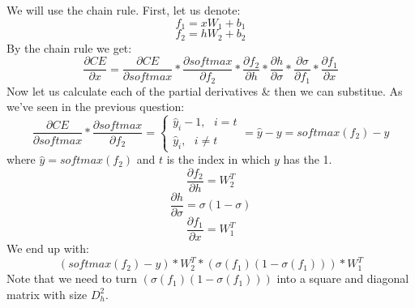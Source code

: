 We will use the chain rule. First, let us denote:
$$f_1 = xW_1 + b_1$$
$$f_2 = hW_2 + b_2$$
By the chain rule we get:
$$\frac{\partial CE}{\partial x} = \frac{\partial CE}{\partial softmax} * \frac{\partial softmax}{\partial f_2} * \frac{\partial f_2}{\partial h} * \frac{\partial h}{\partial \sigma} * \frac{\partial \sigma}{\partial f_1}* \frac{\partial f_1}{\partial x}$$
Now let us calculate each of the partial derivatives \& then we can substitue.
As we've seen in the previous question:
$$
\frac{\partial CE}{\partial softmax} * \frac{\partial softmax}{\partial f_2}=
\begin{cases}
\hat{y}_i - 1, \text{ } i=t  \\ 
\hat{y}_i, \text{     } i\neq t
\end{cases} = \hat{y}-y=softmax(f_2)-y
$$
where $\hat{y}=softmax(f_2)$ and $t$ is the index in which $y$ has the 1.\\
$$\frac{\partial f_2}{\partial h} = W_2^T$$
$$\frac{\partial h}{\partial \sigma} = \sigma(1-\sigma)$$
$$\frac{\partial f_1}{\partial x} = W_1^T$$
We end up with:
$$(softmax(f_2)-y) * W_2^T * (\sigma(f_1)(1-\sigma(f_1))) * W_1^T$$
Note that we need to turn $(\sigma(f_1)(1-\sigma(f_1)))$ into a square and diagonal matrix with size $D_h^2$.